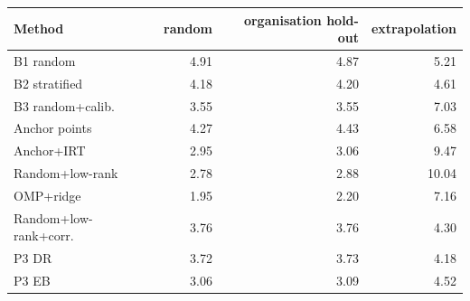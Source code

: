 {\scriptsize
\begin{tabular}{lrrr}
\toprule
Method & random & organisation hold-out & extrapolation \\
\midrule
B1 random & 4.91 & 4.87 & 5.21 \\
B2 stratified & 4.18 & 4.20 & 4.61 \\
B3 random+calib. & 3.55 & 3.55 & 7.03 \\
Anchor points & 4.27 & 4.43 & 6.58 \\
Anchor+IRT & 2.95 & 3.06 & 9.47 \\
Random+low-rank & 2.78 & 2.88 & 10.04 \\
OMP+ridge & 1.95 & 2.20 & 7.16 \\
Random+low-rank+corr. & 3.76 & 3.76 & 4.30 \\
P3 DR & 3.72 & 3.73 & 4.18 \\
P3 EB & 3.06 & 3.09 & 4.52 \\
\bottomrule
\end{tabular}}
